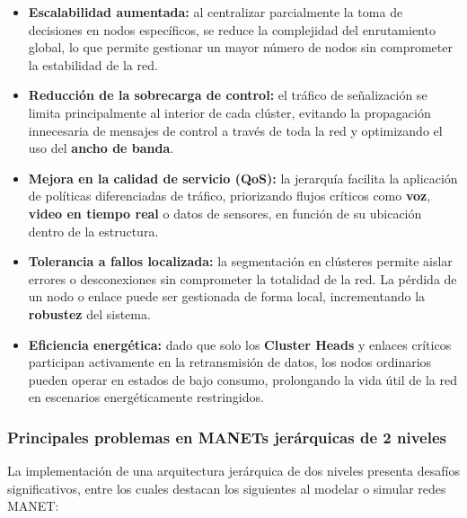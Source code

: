\documentclass{article}
\begin{document}
\begin{itemize}
    \item \textbf{Escalabilidad aumentada:} al centralizar parcialmente la toma de decisiones en nodos específicos, se reduce la complejidad del enrutamiento global, lo que permite gestionar un mayor número de nodos sin comprometer la estabilidad de la red.

    \item \textbf{Reducción de la sobrecarga de control:} el tráfico de señalización se limita principalmente al interior de cada clúster, evitando la propagación innecesaria de mensajes de control a través de toda la red y optimizando el uso del \textbf{ancho de banda}.

    \item \textbf{Mejora en la calidad de servicio (QoS):} la jerarquía facilita la aplicación de políticas diferenciadas de tráfico, priorizando flujos críticos como \textbf{voz}, \textbf{video en tiempo real} o datos de sensores, en función de su ubicación dentro de la estructura.

    \item \textbf{Tolerancia a fallos localizada:} la segmentación en clústeres permite aislar errores o desconexiones sin comprometer la totalidad de la red. La pérdida de un nodo o enlace puede ser gestionada de forma local, incrementando la \textbf{robustez} del sistema.

    \item \textbf{Eficiencia energética:} dado que solo los \textbf{Cluster Heads} y enlaces críticos participan activamente en la retransmisión de datos, los nodos ordinarios pueden operar en estados de bajo consumo, prolongando la vida útil de la red en escenarios energéticamente restringidos.

\end{itemize}


\subsubsection{Principales problemas en MANETs jerárquicas de 2 niveles}
La implementación de una arquitectura jerárquica de dos niveles presenta desafíos significativos, entre los cuales destacan los siguientes al modelar o simular redes MANET:
\end{document}
